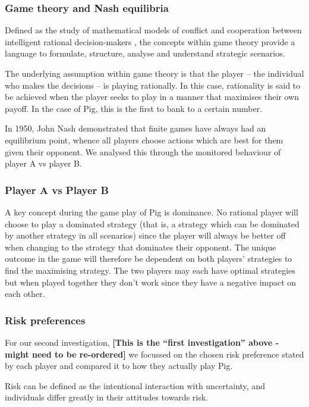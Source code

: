 \documentclass[a4paper,titlepage]{article}
\begin{document}
\subsubsection{Game theory and Nash equilibria}
Defined as the study of mathematical models of conflict and cooperation between intelligent rational decision-makers \cite{roger1991game}, the concepts within game theory provide a language to formulate, structure, analyse and understand strategic scenarios.\cite{turocy2001texas}

The underlying assumption within game theory is that the player – the individual who makes the decisions – is playing rationally. In this case, rationality is said to be achieved when the player seeks to play in a manner that maximises their own payoff. In the case of Pig, this is the first to bank to a certain number.

In 1950, John Nash demonstrated that finite games have always had an equilibrium point, whence all players choose actions which are best for them given their opponent. We analysed this through the monitored behaviour of player A vs player B.
\subsubsection{Player A vs Player B}
A key concept during the game play of Pig is dominance. No rational player will choose to play a dominated strategy (that is, a strategy which can be dominated by another strategy in all scenarios) since the player will always be better off when changing to the strategy that dominates their opponent. The unique outcome in the game will therefore be dependent on both players' strategies to find the maximising strategy. The two players may each have optimal strategies but when played together they don’t work since they have a negative impact on each other.
\subsubsection{Risk preferences}
For our second investigation, \textbf{[This is the ``first investigation'' above - might need to be re-ordered]} we focussed on the chosen risk preference stated by each player and compared it to how they actually play Pig.

Risk can be defined as the intentional interaction with uncertainty, and individuals differ greatly in their attitudes towards risk.\cite{what_is_risk_2017}
\end{document}
